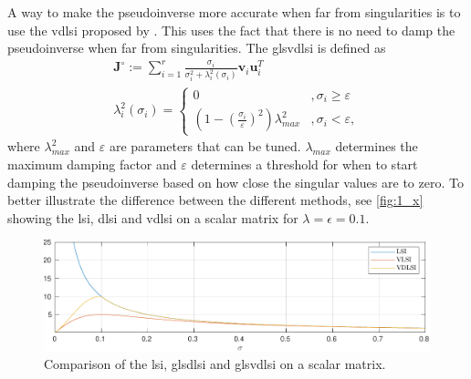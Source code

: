 A way to make the pseudoinverse more accurate when far from singularities is to
use the \gls{vdlsi} proposed by \cite{chiaverini1997}.
This uses the fact that there is no need to damp the pseudoinverse when far from singularities.
The gls{vdlsi} is defined as
\begin{subequations}
\begin{align}
    \bm{J}^{\circ} := \sum_{i=1}^r \frac{\sigma_i}{\sigma_i^2 + \lambda_i^2(\sigma_i)} \bm{v}_i \bm{u}_i^T \\
    \lambda_i^2(\sigma_i) = \begin{cases}
        0 & ,\sigma_i \geq \varepsilon \\
        \left(1-\left(\frac{\sigma_i}{\varepsilon}\right)^2\right)\lambda_{max}^2 & ,\sigma_i < \varepsilon,
    \end{cases}
\end{align}
\end{subequations}
where $\lambda_{max}^2$ and $\varepsilon$ are parameters that can be tuned. $\lambda_{max}$
determines the maximum damping factor and $\varepsilon$ determines a threshold for when
to start damping the pseudoinverse based on how close the singular values are to zero.
To better illustrate the difference between the different methods, see \autoref{fig:1_x}
showing the \gls{lsi}, \gls{dlsi} and \gls{vdlsi} on a scalar matrix for $\lambda=\epsilon=0.1$.

\begin{figure}[h]
    \centering
    \includegraphics[width=\textwidth]{assets/singval.pdf}
    \caption{Comparison of the \gls{lsi}, gls{dlsi} and gls{vdlsi} on a scalar matrix.}
    \label{fig:1_x}
\end{figure}



